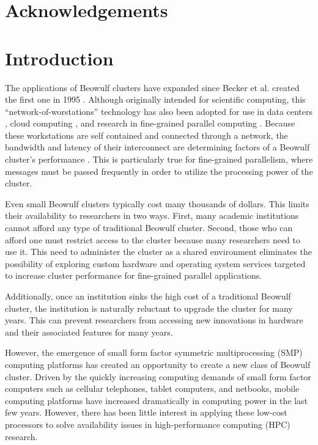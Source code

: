 \documentclass[11pt]{book}
\begin{document}
\chapter*{Acknowledgements}


\tableofcontents \markright{ }
\listoffigures \markright{ }
\listoftables \markright{ }

\clearpage
{}
\setcounter{page}{1}

\chapter{Introduction}
\label{introduction}

The applications of Beowulf clusters have expanded since Becker et al. created
the first one in 1995 \cite{becker-95}. Although originally intended for
scientific computing, this ``network-of-worstations'' technology has also been
adopted for use in data centers \cite{liu-13}, cloud computing
\cite{trivedi-11}, and research in fine-grained parallel computing
\cite{aad-03}. Because these workstations are self contained and connected
through a network, the bandwidth and latency of their interconnect are
determining factors of a Beowulf cluster's performance \cite{lancaster-10}
\cite{becker-95}. This is particularly true for fine-grained parallelism, where
messages must be passed frequently in order to utilize the processing power of
the cluster.

Even small Beowulf clusters typically cost many thousands of dollars. This
limits their availability to researchers in two ways. First, many academic
institutions cannot afford any type of traditional Beowulf cluster. Second,
those who can afford one must restrict access to the cluster because many
researchers need to use it. This need to administer the cluster as a shared
environment eliminates the possibility of exploring custom hardware and
operating system services targeted to increase cluster performance for
fine-grained parallel applications.

Additionally, once an institution sinks the high cost of a traditional Beowulf
cluster, the institution is naturally reluctant to upgrade the cluster for many
years. This can prevent researchers from accessing new innovations in hardware
and their associated features for many years.

However, the emergence of small form factor symmetric multiprocessing (SMP)
computing platforms has created an opportunity to create a new class of Beowulf
cluster. Driven by the quickly increasing computing demands of small form factor
computers such as cellular telephones, tablet computers, and netbooks, mobile
computing platforms have increased dramatically in computing power in the last
few years. However, there has been little interest in applying these low-cost
processors to solve availability issues in high-performance computing (HPC)
research.
\end{document}
